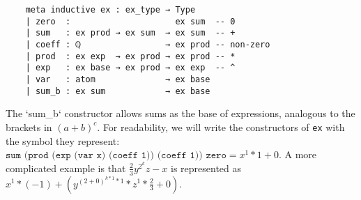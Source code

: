 \documentclass{llncs}
\newcommand{\lean}[1]{\texttt{#1}\xspace} %
\newcommand{\ex}{\lean{ex}}
\begin{document}
\begin{lstlisting}
	meta inductive ex : ex_type → Type
	| zero  :                     ex sum  -- 0
	| sum   : ex prod → ex sum  → ex sum  -- +
	| coeff : ℚ                 → ex prod -- non-zero
	| prod  : ex exp  → ex prod → ex prod -- *
	| exp   : ex base → ex prod → ex exp  -- ^
	| var   : atom              → ex base
	| sum_b : ex sum            → ex base
\end{lstlisting} %

The `sum\_b` constructor allows sums as the base of expressions, analogous to the brackets in $(a + b) ^ c$.
For readability, we will write the constructors of \ex with the symbol they represent: $\lean{sum (prod (exp (var x) (coeff 1)) (coeff 1)) zero} = x^1 * 1 + 0$. 
A more complicated example is that $\frac{2}{3} y^{2^k} z - x$ is represented as $x^1 * (-1) + \left(y^{(2 + 0)^{k * 1} * 1} * z^1 * \frac{2}{3} + 0\right)$.
\end{document}
